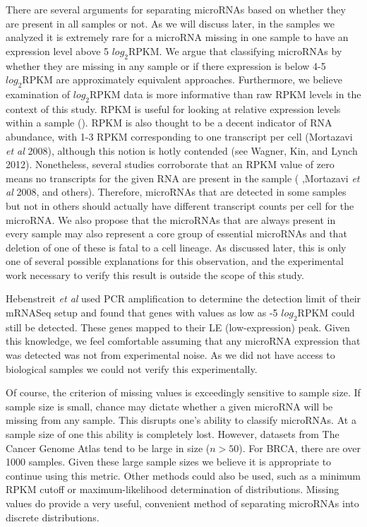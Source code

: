 \documentclass[12pt]{report}
\begin{document}

  There are several arguments for separating microRNAs based on whether they are present in all samples or not. As we will discuss later, in the samples we analyzed it is extremely rare
  for a microRNA missing in one sample to have an expression level above 5 $log_{2} \text{RPKM}$. We argue that classifying microRNAs by whether they are missing in any sample or if there expression
  is below 4-5 $log_{2} \text{RPKM}$ are approximately equivalent approaches. Furthermore, we believe examination of $log_{2} \text{RPKM}$ data is more informative than raw RPKM levels in the context
  of this study. RPKM is useful for looking at relative expression levels within a sample (). RPKM is also thought to be a decent indicator of RNA abundance, with 1-3 RPKM corresponding to one transcript
  per cell (Mortazavi \textit{et al} 2008), although this notion is hotly contended (see Wagner, Kin, and Lynch 2012). Nonetheless, several studies corroborate that an RPKM value of zero
  means no transcripts for the given RNA are present in the sample (\cite{Hebenstreit2011} ,Mortazavi \textit{et al} 2008, and others). Therefore, microRNAs that are detected in some samples but not
  in others should actually have different transcript counts per cell for the microRNA. We also propose that the microRNAs that are always present in every sample may also represent a core group of essential
  microRNAs and that deletion of one of these is fatal to a cell lineage. As discussed later, this is only one of several possible explanations for this observation, and the experimental work necessary
  to verify this result is outside the scope of this study. %
  
  
  Hebenstreit \emph{et al} used PCR amplification to determine the detection limit of their mRNASeq setup and found that
  genes with values as low as -5 $log_{2} \text{RPKM}$ could still be detected. These genes mapped to their LE (low-expression) peak. Given this knowledge, we feel comfortable assuming that any microRNA expression that was detected
  was not from experimental noise. As we did not have access to biological samples we could not verify this experimentally.
  
  Of course, the criterion of missing values is exceedingly sensitive to sample size. If sample size is small, chance may dictate whether a given microRNA will be missing from any sample. This disrupts one's ability
  to classify microRNAs. At a sample size of one this ability is completely lost. However, datasets from The Cancer Genome Atlas tend to be large in size ($n > 50$). For BRCA, there are over 1000 samples. Given these
  large sample sizes we believe it is appropriate to continue using this metric. Other methods could also be used, such as a minimum RPKM cutoff or maximum-likelihood determination of distributions. Missing values
  do provide a very useful, convenient method of separating microRNAs into discrete distributions. %
  
\end{document}
